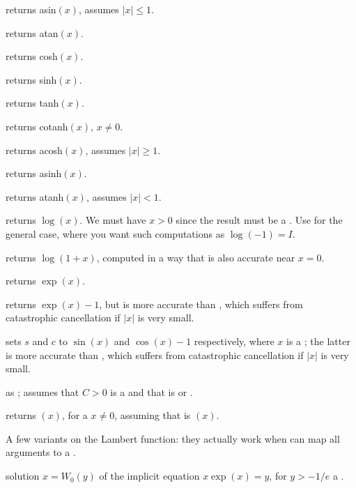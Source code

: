  returns asin$(x)$, assumes $|x| \leq 1$.

 returns atan$(x)$.

%

 returns cosh$(x)$.

 returns sinh$(x)$.

 returns tanh$(x)$.

 returns cotanh$(x)$, $x \neq 0$.

%

 returns acosh$(x)$, assumes $|x| \geq 1$.

 returns asinh$(x)$.

 returns atanh$(x)$, assumes $|x| < 1$.

%

 returns $\log(x)$. We must have $x > 0$
since the result must be a . Use  for the general case,
where you want such computations as $\log(-1) = I$.

 returns $\log(1+x)$, computed in a way that is also
accurate near $x = 0$.

 returns $\exp(x)$.

 returns $\exp(x)-1$, but is more accurate than
, which suffers from catastrophic cancellation if
$|x|$ is very small.

 sets $s$ and $c$ to
$\sin(x)$ and $\cos(x)-1$ respectively, where $x$ is a ; the latter
is more accurate than , which suffers from
catastrophic cancellation if $|x|$ is very small.

 as ; assumes
that $C > 0$ is a  and that  is  or .

 returns $(x)$, for a 
$x\neq 0$, assuming that  is $(x)$.

\noindent A few variants on the Lambert function: they actually work when
 can map all  arguments to a .

 solution $x = W_0(y)$ of the implicit equation
$x \exp(x) = y$, for $y > -1/e$ a .

